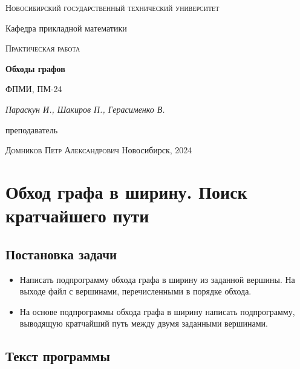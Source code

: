 \documentclass[12pt, a4paper]{article}
\begin{document}
\begin{titlepage}
  \centering
  \textsc{Новосибирский государственный технический университет}\par
  \vspace{1mm}
  Кафедра прикладной математики\par
  \vspace{4cm}
  \textsc{Практическая работа }\par
  {\huge\bfseries Обходы графов\par}
  \vspace{1cm}
  {\scriptsize ФПМИ, ПМ-24\par}
  \vspace{1mm}
  {\itshape\large Параскун И., Шакиров П., Герасименко В.\par}
  \vfill
  {\small преподаватель\par}
  \vspace{1mm}
  \textsc{Домников Петр Александрович}
  \vfill
  \large{Новосибирск, 2024}
\end{titlepage}

\newpage
\setcounter{page}{2}

\section{Обход графа в ширину. Поиск кратчайшего пути}
\subsection{Постановка задачи}
\begin{itemize}
  \item Написать подпрограмму обхода графа в ширину из заданной вершины. На выходе файл с вершинами, перечисленными в порядке обхода.
  \item На основе подпрограммы обхода графа в ширину написать подпрограмму, выводящую кратчайший путь между двумя заданными вершинами.
\end{itemize}

\subsection{Текст программы}

\inputminted[firstline=9, lastline=27]{cpp}{/home/mehandes/c/src/github.com/meha4j/math/gmp/cpp/include/gmp_ucg.hpp}
\inputminted[firstline=11]{cpp}{/home/mehandes/c/src/github.com/meha4j/math/gmp/cpp/src/gmp_ucg.cc}

\newpage
\end{document}

